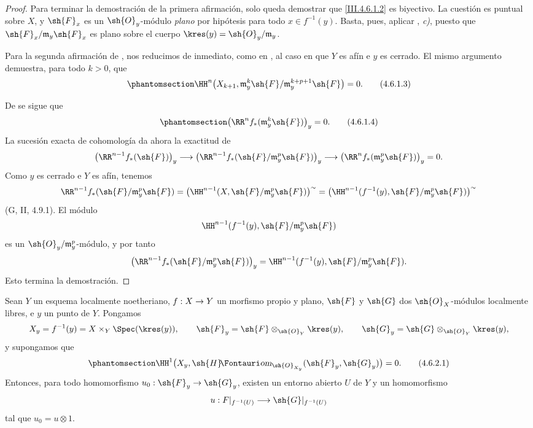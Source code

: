 \documentclass[oneside]{amsart}
\makeatletter
\newcommand{\ega@arrow}[2]{\mathchoice{#1}{#2}{#2}{#2}}
\renewcommand{\to}{\ega@arrow{\longrightarrow}{\rightarrow}}
\newcommand*{\ega@sheafop}[3]{\sh{#1}#2\textup{\kern-2.2pt{\Fontauri\slshape #3}}}
\newcommand*{\shHom}{\ega@sheafop{H}{}{om}}
\newcommand{\oldpage}[2][]{{\marginnote{\normalfont\textbf{#1}~|~#2}}\ignorespaces}
\let\EGAOriginalLabel\label
\renewcommand{\label}[1]{\phantomsection\EGAOriginalLabel{#1}}
\makeatother
\begin{document}
\begin{proof}
Para terminar la demostración de la primera afirmación, solo queda demostrar
que \eqref{III.4.6.1.2} es biyectivo. La cuestión es puntual sobre
$X$, y $\sh{F}_x$ es un $\sh{O}_y$-módulo \emph{plano} por hipótesis para
todo $x\in f^{-1}(y)$. Basta, pues, aplicar
, \emph{c)}, puesto que
$\sh{F}_x/\mathfrak m_y\sh{F}_x$ es plano sobre el cuerpo
$\kres(y)=\sh{O}_y/\mathfrak m_y$.

Para la segunda afirmación de , nos reducimos de inmediato, como
en , al caso en que $Y$ es afín e $y$ es
cerrado. El mismo argumento demuestra, para todo $k>0$, que
\[
\label{III.4.6.1.3}
  \HH^n\bigl(X_{k+1},
    \mathfrak m_y^k\sh{F}/
      \mathfrak m_y^{k+p+1}\sh{F}\bigr)=0.
  \tag{4.6.1.3}
\]

\oldpage[III]{141}

De  se sigue que
\[
\label{III.4.6.1.4}
  \bigl(\RR^n f_*(\mathfrak m_y^k\sh{F})\bigr)_y=0.
  \tag{4.6.1.4}
\]
La sucesión exacta de cohomología da ahora la exactitud de
\[
  \bigl(\RR^{n-1}f_*(\sh{F})\bigr)_y
  \longrightarrow
  \bigl(\RR^{n-1}f_*
    (\sh{F}/\mathfrak m_y^p\sh{F})\bigr)_y
  \longrightarrow
  \bigl(\RR^n f_*(\mathfrak m_y^p\sh{F})\bigr)_y=0.
\]
Como $y$ es cerrado e $Y$ es afín, tenemos
\[
  \RR^{n-1}f_*(\sh{F}/\mathfrak m_y^p\sh{F})
  =
  \bigl(\HH^{n-1}
    (X,\sh{F}/\mathfrak m_y^p\sh{F})\bigr)^{\sim}
  =
  \bigl(\HH^{n-1}
    (f^{-1}(y),\sh{F}/\mathfrak m_y^p\sh{F})\bigr)^{\sim}
\]
(G, II, 4.9.1). El módulo
\[
  \HH^{n-1}
    (f^{-1}(y),\sh{F}/\mathfrak m_y^p\sh{F})
\]
es un $\sh{O}_y/\mathfrak m_y^p$-módulo, y por tanto
\[
  \bigl(\RR^{n-1}f_*
    (\sh{F}/\mathfrak m_y^p\sh{F})\bigr)_y
  =
  \HH^{n-1}
    (f^{-1}(y),\sh{F}/\mathfrak m_y^p\sh{F}).
\]
Esto termina la demostración.
\end{proof}

\begin{corollary}[4.6.2]
\label{III.4.6.2}
Sean $Y$ un esquema localmente noetheriano, $f:X\to Y$ un
morfismo propio y plano, $\sh{F}$ y $\sh{G}$ dos
$\sh{O}_X$-módulos localmente libres, e $y$ un punto de $Y$. Pongamos
\[
  X_y=f^{-1}(y)=X\times_Y\Spec(\kres(y)),\qquad
  \sh{F}_y=\sh{F}\otimes_{\sh{O}_Y}\kres(y),\qquad
  \sh{G}_y=\sh{G}\otimes_{\sh{O}_Y}\kres(y),
\]
y supongamos que
\[
\label{III.4.6.2.1}
  \HH^1\bigl(
    X_y,\shHom_{\sh{O}_{X_y}}(\sh{F}_y,\sh{G}_y)
  \bigr)=0.
  \tag{4.6.2.1}
\]
Entonces, para todo homomorfismo $u_0:\sh{F}_y\to\sh{G}_y$, existen
un entorno abierto $U$ de $Y$ y un homomorfismo
\[
  u:F|_{f^{-1}(U)}\longrightarrow
    \sh{G}|_{f^{-1}(U)}
\]
tal que $u_0=u\otimes1$.
\end{corollary}
\end{document}
